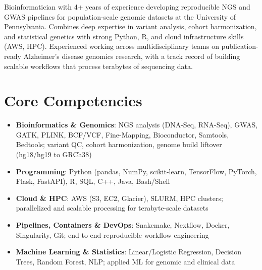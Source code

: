 \documentclass[11pt,a4paper,sans]{moderncv}
\begin{document}
\makecvtitle


\vspace{6pt}
\small{Bioinformatician with 4+ years of experience developing reproducible NGS and GWAS pipelines for population-scale genomic datasets at the University of Pennsylvania. Combines deep expertise in variant analysis, cohort harmonization, and statistical genetics with strong Python, R, and cloud infrastructure skills (AWS, HPC). Experienced working across multidisciplinary teams on publication-ready Alzheimer's disease genomics research, with a track record of building scalable workflows that process terabytes of sequencing data.}


\section{Core Competencies}
\vspace{1pt}
\begin{itemize}

\item \textbf{Bioinformatics \& Genomics}: NGS analysis (DNA-Seq, RNA-Seq), GWAS, GATK, PLINK, BCF/VCF, Fine-Mapping, Bioconductor, Samtools, Bedtools; variant QC, cohort harmonization, genome build liftover (hg18/hg19 to GRCh38)

\item \textbf{Programming}: Python (pandas, NumPy, scikit-learn, TensorFlow, PyTorch, Flask, FastAPI), R, SQL, C++, Java, Bash/Shell

\item \textbf{Cloud \& HPC}: AWS (S3, EC2, Glacier), SLURM, HPC clusters; parallelized and scalable processing for terabyte-scale datasets

\item \textbf{Pipelines, Containers \& DevOps}: Snakemake, Nextflow, Docker, Singularity, Git; end-to-end reproducible workflow engineering

\item \textbf{Machine Learning \& Statistics}: Linear/Logistic Regression, Decision Trees, Random Forest, NLP; applied ML for genomic and clinical data

\end{itemize}
\end{document}
